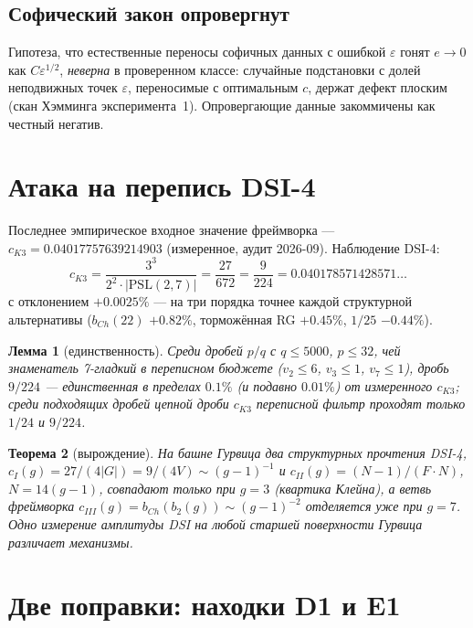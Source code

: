 \documentclass[11pt,a4paper]{article}
\newtheorem{theorem}{Теорема}
\newtheorem{lemma}[theorem]{Лемма}
\theoremstyle{definition}
\begin{document}
\subsection{Софический закон опровергнут}

Гипотеза, что естественные переносы софичных данных с ошибкой
$\varepsilon$ гонят $e \to 0$ как $C\varepsilon^{1/2}$, \emph{неверна}
в проверенном классе: случайные подстановки с долей неподвижных точек
$\varepsilon$, переносимые с оптимальным $c$, держат дефект плоским
(скан Хэмминга эксперимента~1). Опровергающие данные закоммичены как
честный негатив.

\section{Атака на перепись DSI-4}\label{sec:census}

Последнее эмпирическое входное значение фреймворка ---
$c_{K3} = 0.04017757639214903$ (измеренное, аудит 2026-09).
Наблюдение DSI-4:
\[
c_{K3} = \frac{3^3}{2^2\cdot|\mathrm{PSL}(2,7)|} = \frac{27}{672} =
\frac{9}{224} = 0.040178571428571\ldots
\]
с отклонением $+0.0025\%$ --- на три порядка точнее каждой структурной
альтернативы ($b_{Ch}(22)$ $+0.82\%$, торможённая RG $+0.45\%$,
$1/25$ $-0.44\%$).

\begin{lemma}[единственность]\label{lem:uniqueness}
Среди дробей $p/q$ с $q \le 5000$, $p \le 32$, чей знаменатель
7-гладкий в переписном бюджете ($v_2 \le 6$, $v_3 \le 1$, $v_7 \le 1$),
дробь $9/224$ --- единственная в пределах $0.1\%$ (и подавно $0.01\%$)
от измеренного $c_{K3}$; среди подходящих дробей цепной дроби $c_{K3}$
переписной фильтр проходят только $1/24$ и $9/224$.
\end{lemma}

\begin{theorem}[вырождение]\label{thm:degeneracy}
На башне Гурвица два структурных прочтения DSI-4,
$c_I(g) = 27/(4|G|) = 9/(4V) \sim (g-1)^{-1}$ и
$c_{II}(g) = (N-1)/(F\cdot N)$, $N = 14(g-1)$, совпадают \emph{только
при} $g = 3$ (квартика Клейна), а ветвь фреймворка
$c_{III}(g) = b_{Ch}(b_2(g)) \sim (g-1)^{-2}$ отделяется уже при
$g = 7$. Одно измерение амплитуды DSI на любой старшей поверхности
Гурвица различает механизмы.
\end{theorem}

\section{Две поправки: находки D1 и E1}\label{sec:findings}
\end{document}
